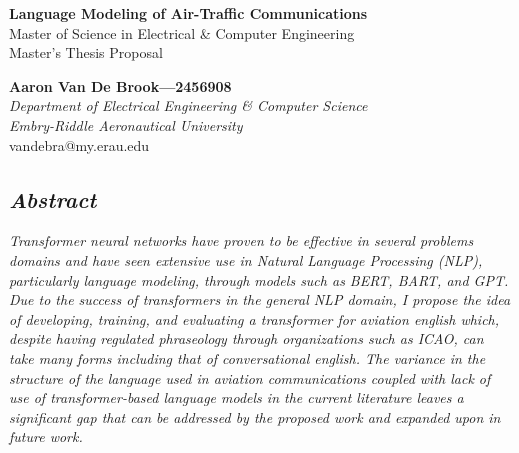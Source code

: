 \documentclass[10pt]{article}
\begin{document}
    \begin{center}
        \LARGE
        \textbf{Language Modeling of Air-Traffic Communications}\\
        \Large
        Master of Science in Electrical \& Computer Engineering\\
        Master's Thesis Proposal\\

        \vspace*{0.25in}

        \normalsize
        \textbf{Aaron Van De Brook---2456908}\\
        \textit{Department of Electrical Engineering \& Computer Science}\\
        \textit{Embry-Riddle Aeronautical University}\\
        vandebra@my.erau.edu
    \end{center}

    \begin{center}
        \section*{\textit{Abstract}}
        \justifying
        \textit{
            Transformer neural networks have proven to be effective in several problems domains and have seen extensive use
            in Natural Language Processing (NLP), particularly language modeling, through models such as BERT, BART, and GPT. Due
            to the success of transformers in the general NLP domain, I propose the idea of developing, training, and evaluating
            a transformer for aviation english which, despite having regulated phraseology through organizations such as ICAO,
            can take many forms including that of conversational english. The variance in the structure of the language used
            in aviation communications coupled with lack of use of transformer-based language models in the current literature
            leaves a significant gap that can be addressed by the proposed work and expanded upon in future work.
        }
    \end{center}

\end{document}
